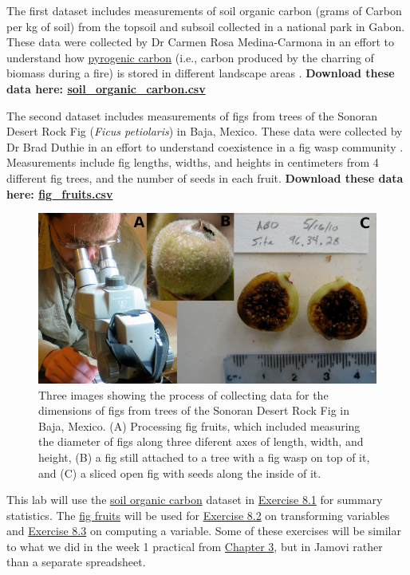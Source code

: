 \documentclass[
]{scrbook}
\begin{document}
The first dataset includes measurements of soil organic carbon (grams of Carbon per kg of soil) from the topsoil and subsoil collected in a national park in Gabon.
These data were collected by Dr Carmen Rosa Medina-Carmona in an effort to understand how \href{https://bg.copernicus.org/articles/3/397/2006/bg-3-397-2006.pdf}{pyrogenic carbon} (i.e., carbon produced by the charring of biomass during a fire) is stored in different landscape areas \citep{Santin2016, Preston2006}.
\textbf{Download these data here: \href{https://raw.githubusercontent.com/bradduthie/statistical_techniques/main/data/soil_organic_carbon.csv}{soil\_organic\_carbon.csv}}

The second dataset includes measurements of figs from trees of the Sonoran Desert Rock Fig (\emph{Ficus petiolaris}) in Baja, Mexico.
These data were collected by Dr Brad Duthie in an effort to understand coexistence in a fig wasp community \citep{Duthie2015b, Duthie2016}.
Measurements include fig lengths, widths, and heights in centimeters from 4 different fig trees, and the number of seeds in each fruit.
\textbf{Download these data here: \href{https://raw.githubusercontent.com/bradduthie/statistical_techniques/main/data/fig_fruits.csv}{fig\_fruits.csv}}

\begin{figure}
\includegraphics[width=1\linewidth]{img/fig_data_set} \caption{Three images showing the process of collecting data for the dimensions of figs from trees of the Sonoran Desert Rock Fig in Baja, Mexico. (A) Processing fig fruits, which included measuring the diameter of figs along three diferent axes of length, width, and height, (B) a fig still attached to a tree with a fig wasp on top of it, and (C) a sliced open fig with seeds along the inside of it.}\label{fig:unnamed-chunk-20}
\end{figure}

This lab will use the \href{https://raw.githubusercontent.com/bradduthie/statistical_techniques/main/data/soil_organic_carbon.csv}{soil organic carbon} dataset in \protect\hyperlink{02_summary_statistics}{Exercise 8.1} for summary statistics.
The \href{https://raw.githubusercontent.com/bradduthie/statistical_techniques/main/data/fig_fruits.csv}{fig fruits} will be used for \protect\hyperlink{02_transforming_variables}{Exercise 8.2} on transforming variables and \protect\hyperlink{02_computing_variables}{Exercise 8.3} on computing a variable.
Some of these exercises will be similar to what we did in the week 1 practical from \protect\hyperlink{ux5cux23Chapter_3}{Chapter 3}, but in Jamovi rather than a separate spreadsheet.
\end{document}
